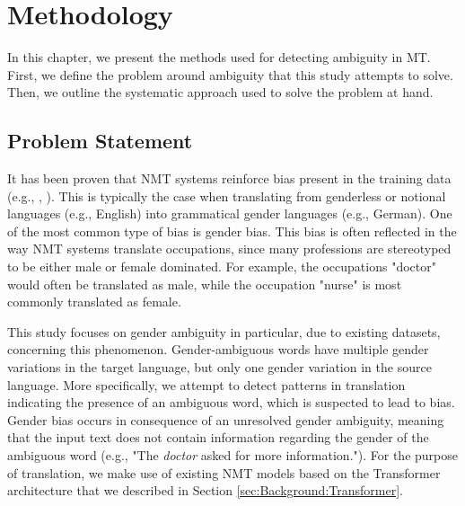 \chapter{Methodology}
\label{ch:Methodology}


In this chapter, we present the methods used for detecting ambiguity in MT. First, we define the problem around ambiguity that this study attempts to solve. Then, we outline the systematic approach used to solve the problem at hand.

\section{Problem Statement}
\label{sec:Methodology:Problem}

It has been proven that NMT systems reinforce bias present in the training data (e.g., \citet{Prates_2019}, \citet{Stanovsky_2019}). This is typically the case when translating from genderless or notional languages (e.g., English) into grammatical gender languages (e.g., German). One of the most common type of bias is gender bias. 
This bias is often reflected in the way NMT systems translate occupations, since many professions are stereotyped to be either male or female dominated. For example, the occupations "doctor" would often be translated as male, while the occupation "nurse" is most commonly translated as female. 

This study focuses on gender ambiguity in particular, due to existing datasets, concerning this phenomenon. Gender-ambiguous words have multiple gender variations in the target language, but only one gender variation in the source language. More specifically, we attempt to detect patterns in translation indicating the presence of an ambiguous word, which is suspected to lead to bias. Gender bias occurs in consequence of an unresolved gender ambiguity, meaning that the input text does not contain information regarding the gender of the ambiguous word (e.g., "The \textit{doctor} asked for more information."). For the purpose of translation, we make use of existing NMT models based on the Transformer architecture that we described in Section \ref{sec:Background:Transformer}.



